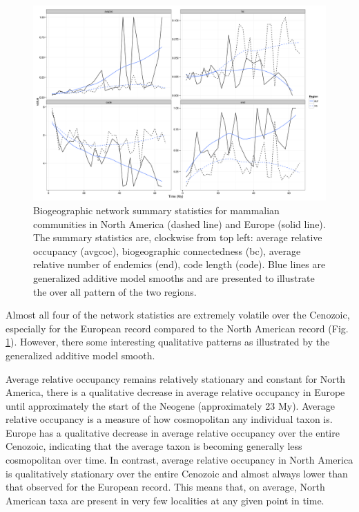 \documentclass[12pt,letterpaper]{article}
\begin{document}
\begin{figure}[ht]
  \begin{center}
    \includegraphics[height = 0.4\textheight, keepaspectratio = true]{figure/gen_bin}
  \end{center}
  \caption{Biogeographic network summary statistics for mammalian communities in North America (dashed line) and Europe (solid line). The summary statistics are, clockwise from top left: average relative occupancy (avgcoc), biogeographic connectedness (bc), average relative number of endemics (end), code length (code). Blue lines are generalized additive model smooths and are presented to illustrate the over all pattern of the two regions.} 
  \label{fig:mam_tot}
\end{figure}

Almost all four of the network statistics are extremely volatile over the Cenozoic, especially for the European record compared to the North American record (Fig. \ref{fig:mam_tot}). However, there some interesting qualitative patterns as illustrated by the generalized additive model smooth.

Average relative occupancy remains relatively stationary and constant for North America, there is a qualitative decrease in average relative occupancy in Europe until approximately the start of the Neogene (approximately 23 My). Average relative occupancy is a measure of how cosmopolitan any individual taxon is. Europe has a qualitative decrease in average relative occupancy over the entire Cenozoic, indicating that the average taxon is becoming generally less cosmopolitan over time. In contrast, average relative occupancy in North America is qualitatively stationary over the entire Cenozoic and almost always lower than that observed for the European record. This means that, on average, North American taxa are present in very few localities at any given point in time.
\end{document}
